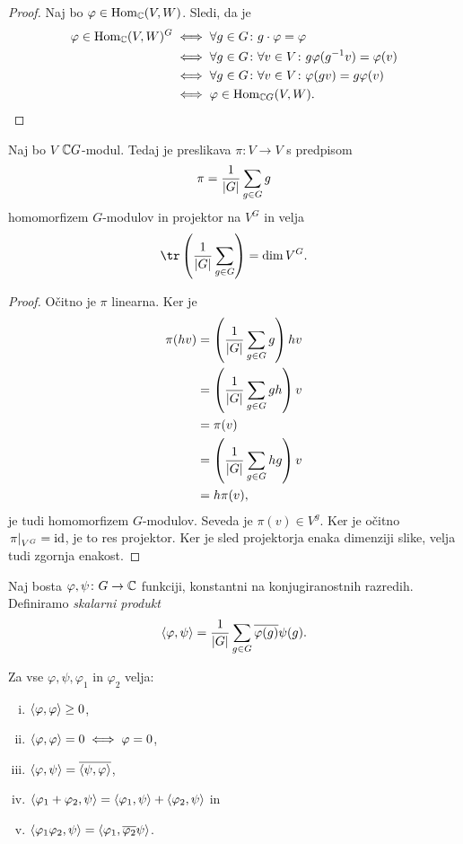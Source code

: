 \begin{proof}
Naj bo $\varphi \in \operatorname{Hom}_{\mathbb{C}}(V, W)$. Sledi, da je
\begin{align*}
\varphi \in \operatorname{Hom}_{\mathbb{C}}(V,W)^G &\iff
\forall g \in G \colon g \cdot \varphi = \varphi
\\
&\iff
\forall g \in G \colon \forall v \in V \colon
g \varphi(g^{-1} v) = \varphi(v)
\\
&\iff
\forall g \in G \colon \forall v \in V \colon
\varphi(g v) = g \varphi(v)
\\
&\iff
\varphi \in \operatorname{Hom}_{\mathbb{C} G}(V, W). \qedhere
\end{align*}
\end{proof}

\begin{lema}
Naj bo $V$ $\mathbb{C} G$-modul. Tedaj je preslikava $\pi \colon V \to V$ s
predpisom
\[
\pi = \frac{1}{\left\lvert G\right\rvert} \sum_{g \in G} g
\]
homomorfizem $G$-modulov in projektor na $V^G$ in velja
\[
\tr \br{\frac{1}{\abs{G}} \sum_{g \in G}} = \dim V^G.
\]
\end{lema}

\begin{proof}
Očitno je $\pi$ linearna. Ker je
\begin{align*}
\pi(hv) &=
\left(\frac{1}{\left\lvert G\right\rvert} \sum_{g \in G} g\right) hv
\\
&=
\left(\frac{1}{\left\lvert G\right\rvert} \sum_{g \in G} gh\right) v
\\
&=
\pi(v)
\\
&=
\left(\frac{1}{\left\lvert G\right\rvert} \sum_{g \in G} hg\right) v
\\
&=
h \pi(v),
\end{align*}
je tudi homomorfizem $G$-modulov. Seveda je $\pi(v) \in V^g$. Ker
je očitno $\left. \pi\right|_{V^G}^{} = \operatorname{id}$, je to res projektor. Ker je
sled projektorja enaka dimenziji slike, velja tudi zgornja enakost.
\end{proof}

\begin{definicija}
Naj bosta $\varphi, \psi \colon G \to \mathbb{C}$ funkciji, konstantni na
konjugiranostnih razredih. Definiramo
\emph{skalarni produkt}
\[
\left\langle \varphi, \psi\right\rangle =
\frac{1}{\left\lvert G\right\rvert} \sum_{g \in G} \overline{\varphi(g)} \psi(g).
\]
\end{definicija}

\begin{trditev}
Za vse $\varphi, \psi, \varphi_1$ in $\varphi_2$ velja:

\begin{enumerate}[i)]
\item $\left\langle \varphi, \varphi\right\rangle \geq 0$,
\item $\left\langle \varphi, \varphi\right\rangle = 0 \iff \varphi = 0$,
\item $\left\langle \varphi, \psi\right\rangle = \overline{\left\langle \psi, \varphi\right\rangle}$,
\item $\left\langle \varphi_1 + \varphi_2, \psi\right\rangle =
\left\langle \varphi_1, \psi\right\rangle + \left\langle \varphi_2, \psi\right\rangle$ in
\item $\left\langle \varphi_1 \varphi_2, \psi\right\rangle =
\left\langle \varphi_1, \overline{\varphi_2} \psi\right\rangle$.
\end{enumerate}
\end{trditev}

